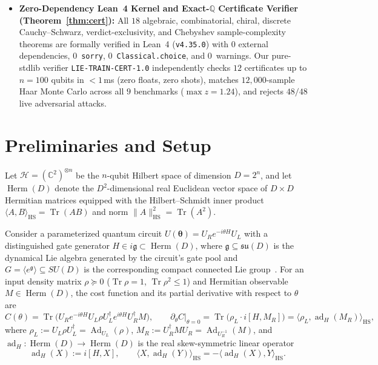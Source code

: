 \documentclass[11pt,a4paper]{article}
\theoremstyle{definition}
\theoremstyle{remark}
\newcommand{\QQ}{\mathbb{Q}}
\newcommand{\CC}{\mathbb{C}}
\newcommand{\Tr}{\operatorname{Tr}}
\newcommand{\Ad}{\operatorname{Ad}}
\newcommand{\ad}{\operatorname{ad}}
\newcommand{\HS}{\mathrm{HS}}
\newcommand{\Herm}{\operatorname{Herm}}
\newcommand{\su}{\mathfrak{su}}
\newcommand{\lieg}{\mathfrak{g}}
\newcommand{\certschema}{\texttt{LIE-TRAIN-CERT-1.0}}
\begin{document}
\begin{itemize}[leftmargin=1.6em,itemsep=2pt]
  \item \textbf{Zero-Dependency Lean~4 Kernel and Exact-$\QQ$ Certificate Verifier (Theorem~\ref{thm:cert}):} All $18$ algebraic, combinatorial, chiral, discrete Cauchy--Schwarz, verdict-exclusivity, and Chebyshev sample-complexity theorems are formally verified in Lean~4 (\texttt{v4.35.0}) with $0$ external dependencies, $0$~\texttt{sorry}, $0$~\texttt{Classical.choice}, and $0$~warnings. Our pure-stdlib verifier \certschema{} independently checks $12$ certificates up to $n=100$ qubits in $< 1$\,ms (zero floats, zero shots), matches $12{,}000$-sample Haar Monte Carlo across all $9$ benchmarks ($\max z = 1.24$), and rejects $48/48$ live adversarial attacks.
\end{itemize}

\section{Preliminaries and Setup}

Let $\mathcal{H} = (\CC^2)^{\otimes n}$ be the $n$-qubit Hilbert space of dimension $D = 2^n$, and let $\Herm(D)$ denote the $D^2$-dimensional real Euclidean vector space of $D \times D$ Hermitian matrices equipped with the Hilbert--Schmidt inner product $\langle A, B\rangle_{\HS} = \Tr(AB)$ and norm $\|A\|_{\HS}^2 = \Tr(A^2)$.

Consider a parameterized quantum circuit $U(\boldsymbol{\theta}) = U_R e^{-i\theta H} U_L$ with a distinguished gate generator $H \in i\lieg \subset \Herm(D)$, where $\lieg \subseteq \su(D)$ is the dynamical Lie algebra generated by the circuit's gate pool and $G = \langle e^{\lieg}\rangle \subseteq SU(D)$ is the corresponding compact connected Lie group~\cite{ragone2024lie,xie2026structure}. For an input density matrix $\rho \succeq 0$ ($\Tr\rho = 1$, $\Tr\rho^2 \le 1$) and Hermitian observable $M \in \Herm(D)$, the cost function and its partial derivative with respect to $\theta$ are
\begin{equation}
  C(\theta) = \Tr\!\bigl(U_R e^{-i\theta H} U_L \rho U_L^\dagger e^{i\theta H} U_R^\dagger M\bigr), \qquad
  \partial_\theta C\big|_{\theta=0} = \Tr\!\bigl(\rho_L \cdot i[H, M_R]\bigr) = \langle \rho_L, \ad_H(M_R)\rangle_{\HS},
\end{equation}
where $\rho_L := U_L \rho U_L^\dagger = \Ad_{U_L}(\rho)$, $M_R := U_R^\dagger M U_R = \Ad_{U_R^{-1}}(M)$, and $\ad_H : \Herm(D) \to \Herm(D)$ is the real skew-symmetric linear operator
\begin{equation}
  \ad_H(X) := i[H, X], \qquad \langle X, \ad_H(Y)\rangle_{\HS} = -\langle \ad_H(X), Y\rangle_{\HS}.
\end{equation}
\end{document}
